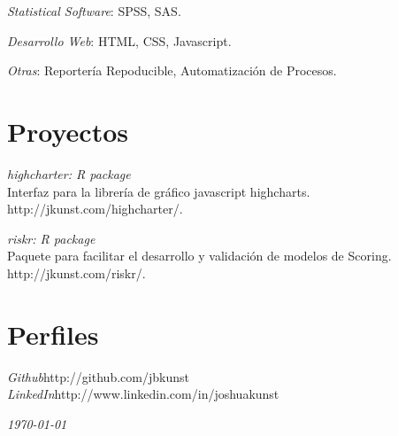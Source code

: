 \documentclass[margin]{res}
\begin{document}
\begin{resume}
    {\sl Statistical Software}: SPSS, SAS.
    
    {\sl Desarrollo Web}: HTML, CSS, Javascript.
    
    {\sl Otras}: Reportería Repoducible, Automatización de Procesos.

\vspace{1cm}

\newpage

\section{Proyectos}


    {\sl highcharter: R package}\\
    Interfaz para la librería de gráfico javascript highcharts.\\
    http://jkunst.com/highcharter/.
    
    {\sl riskr: R package}\\
    Paquete para facilitar el desarrollo y validación de modelos
    de Scoring.\\
    http://jkunst.com/riskr/.

\vspace{1cm}

\section{Perfiles}
    
    {\sl Github}\hfill http://github.com/jbkunst\\
    
    {\sl LinkedIn}\hfill http://www.linkedin.com/in/joshuakunst

\vspace{1cm}


\end{resume}

\vspace{0.5cm}

\hfill {\sl \today}
\end{document}
